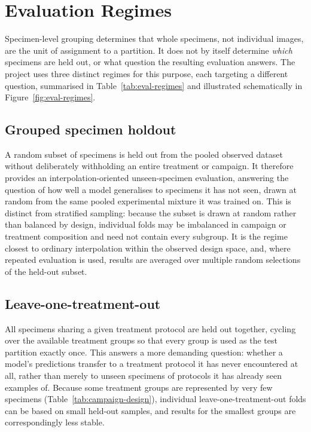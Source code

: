 \section{Evaluation Regimes}
\label{sec:eval-regimes}

Specimen-level grouping determines that whole specimens, not individual
images, are the unit of assignment to a partition. It does not by itself
determine \emph{which} specimens are held out, or what question the
resulting evaluation answers. The project uses three distinct regimes for
this purpose, each targeting a different question, summarised in
Table~\ref{tab:eval-regimes} and illustrated schematically in
Figure~\ref{fig:eval-regimes}.

\subsection{Grouped specimen holdout}
\label{sec:grouped-holdout}

A random subset of specimens is held out from the pooled observed dataset
without deliberately withholding an entire treatment or campaign. It
therefore provides an interpolation-oriented unseen-specimen evaluation,
answering the question of how well a model generalises to specimens it
has not seen, drawn at random from the same pooled experimental mixture
it was trained on. This is distinct from stratified sampling: because the
subset is drawn at random rather than balanced by design, individual
folds may be imbalanced in campaign or treatment composition and need not
contain every subgroup. It is the regime closest to ordinary interpolation
within the observed design space, and, where repeated evaluation is used,
results are averaged over multiple random selections of the held-out
subset.

\subsection{Leave-one-treatment-out}
\label{sec:loto}

All specimens sharing a given treatment protocol are held out together,
cycling over the available treatment groups so that every group is used
as the test partition exactly once. This answers a more demanding
question: whether a model's predictions transfer to a treatment protocol
it has never encountered at all, rather than merely to unseen specimens of
protocols it has already seen examples of. Because some treatment groups
are represented by very few specimens (Table~\ref{tab:campaign-design}),
individual leave-one-treatment-out folds can be based on small held-out
samples, and results for the smallest groups are correspondingly less
stable.

